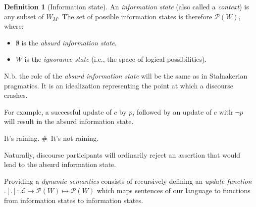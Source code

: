 \documentclass[nols,twoside,nofonts,nobib,nohyper]{tufte-handout}
\theoremstyle{definition}
\newtheorem{definition}{Definition}[section]
\begin{document}
\begin{definition}[Information state]
  An \textit{information state} (also called a \textit{context}) is any subset of $W_{M}$. The set of possible information states is therefore $\mathscr{P}(W)$, where:
  \begin{itemize}
      \item $∅$ is the \textit{absurd information state}.
      \item $W$ is the \textit{ignorance state} (i.e., the space of logical possibilities).
  \end{itemize}
\end{definition}

N.b. the role of the \textit{absurd information state} will be the same as in Stalnakerian pragmatics. It is an idealization representing the point at which a discourse crashes.

For example, a successful update of $c$ by $p$, followed by an update of $c$ with $¬ p$ will result in the absurd information state.

\ex
It's raining. \# It's not raining.
\xe

Naturally, discourse participants will ordinarily reject an assertion that would lead to the absurd information state.

Providing a \textit{dynamic semantics} consists of recursively defining an \textit{update function} $.[.]:\mathscr{L} ↦ \mathscr{P}(W) ↦ \mathscr{P}(W)$ which maps sentences of our language to functions from information states to information states.
\end{document}
